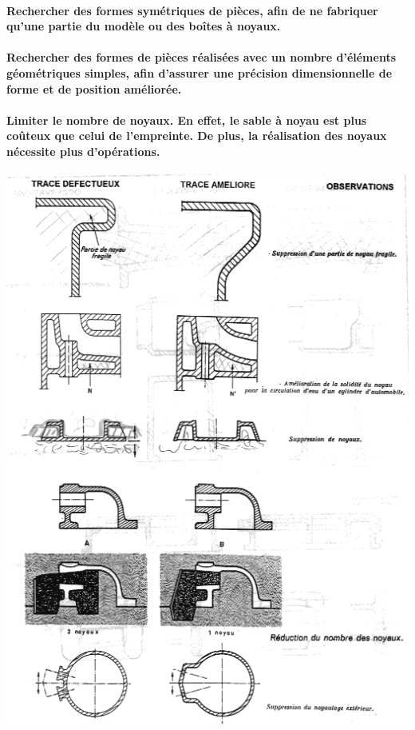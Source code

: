\documentclass[11pt,oneside]{article}
\begin{document}
\paragraph*{Rechercher des formes symétriques de pièces, afin de ne fabriquer
qu'une partie du modèle ou des boîtes à noyaux.}


\paragraph*{Rechercher des formes de pièces réalisées avec un nombre d'éléments
géométriques simples, afin d'assurer une précision dimensionnelle de forme et
de position améliorée.}

\paragraph*{Limiter le nombre de noyaux. En effet, le sable à noyau est plus
coûteux que celui de l'empreinte. De plus, la réalisation des noyaux nécessite
plus d'opérations.}

\begin{center}
 \includegraphics[width=.8\textwidth]{png/regles_noyau}
\end{center}
\end{document}
